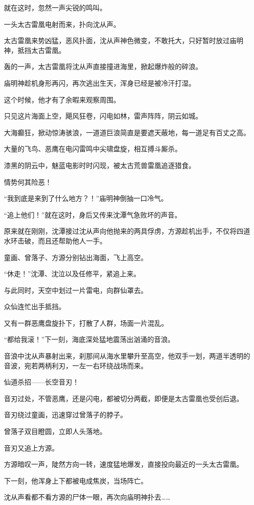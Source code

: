 \begin{this_body}
就在这时，忽然一声尖锐的鸣叫。

一头太古雷凰电射而来，扑向沈从声。

太古雷凰来势凶猛，恶风扑面，沈从声神色微变，不敢托大，只好暂时放过庙明神，抵挡太古雷凰。

轰的一声，太古雷凰将沈从声直接撞进海里，掀起爆炸般的碎浪。

庙明神趁机身形再闪，再次逃出生天，浑身已经是被冷汗打湿。

这个时候，他才有了余暇来观察周围。

只见这片海面上空，飓风狂卷，闪电如林，雷声阵阵，阴云如城。

大海癫狂，掀动惊涛骇浪，一道道巨浪简直是要遮天蔽地，每一道足有百丈之高。

大量的飞鸟、恶鹰在电闪雷鸣中尖啸盘旋，相互搏斗厮杀。

漆黑的阴云中，魅蓝电影时时闪现，被太古荒兽雷凰追逐猎食。

情势何其险恶！

“我到底是来到了什么地方？！”庙明神倒抽一口冷气。

“追上他们！”就在这时，身后又传来沈潭气急败坏的声音。

原来就在刚刚，沈潭接过沈从声向他抛来的两具俘虏，方源趁机出手，不仅将四道水环击破，而且还帮助他人一手。

童画、曾落子、方源分别钻出海面，飞上高空。

“休走！”沈潭、沈泣以及任修平，紧追上来。

与此同时，天空中划过一片雷电，向群仙罩去。

众仙连忙出手抵挡。

又有一群恶鹰盘旋扑下，打散了人群，场面一片混乱。

“都给我滚！”下一刻，海底深处猛地震荡出汹涌的音浪。

音浪中沈从声暴射出来，刹那间从海水里攀升至高空，他双手一划，两道半透明的音波，宛若两柄利刃，一左一右环绕战场而来。

仙道杀招——长空音刃！

音刃过处，不管恶鹰，还是闪电，都被切分两截，即便是太古雷凰也受创后退。

音刃绕过童画，迅速穿过曾落子的脖子。

曾落子双目瞪圆，立即人头落地。

音刃又追上方源。

方源暗叹一声，陡然方向一转，速度猛地爆发，直接投向最近的一头太古雷凰。

下一刻，他浑身上下都被电成焦炭，当场阵亡。

沈从声看都不看方源的尸体一眼，再次向庙明神扑去……


\end{this_body}
